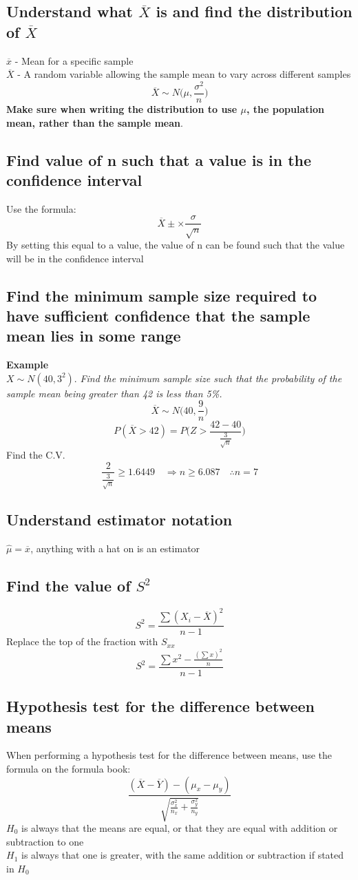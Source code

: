 \documentclass{article}[18pt]
\begin{document}
\subsection{Understand what $\overline{X}$ is and find the distribution of $\overline{X}$}
$\overline{x}$ - Mean for a specific sample\\
$\overline{X}$  - A random variable allowing the sample mean to vary across different samples
$$\overline{X}\sim N\Bigg(\mu,\frac{\sigma^2}{n}\Bigg)$$
\textbf{Make sure when writing the distribution to use $\mu$, the population mean, rather than the sample mean}.
\subsection{Find value of n such that a value is in the confidence interval}
Use the formula:
$$\overline{X}\pm \times\frac{\sigma}{\sqrt{n}}$$
By setting this equal to a value, the value of n can be found such that the value will be in the confidence interval

\subsection{Find the minimum sample size required to have sufficient confidence that the sample mean lies in some range}
\textbf{Example}\\
$X\sim N(40,3^2)$. \textit{Find the minimum sample size such that the probability of the sample mean being greater than 42 is less than 5\%.}
$$\overline{X}\sim N\Bigg(40,\frac{9}{n}\Bigg)$$
$$P(\overline{X}>42)=P\Bigg(Z>\frac{42-40}{\frac{3}{\sqrt{n}}}\Bigg)$$
Find the C.V.
$$\frac{2}{\frac{3}{\sqrt{n}}}\geqslant1.6449\quad \Rightarrow n\geqslant6.087 \quad \therefore n=7$$
\subsection{Understand estimator notation}
$\hat{\mu}=\overline{x}$, anything with a hat on is an estimator
\subsection{Find the value of $S^2$}
$$S^2=\frac{\sum(X_i-\overline{X})^2}{n-1}$$
Replace the top of the fraction with $S_{xx}$
$$S^2=\frac{\sum x^2-\frac{(\sum x)^2}{n}}{n-1}$$
\subsection{Hypothesis test for the difference between means} 
When performing a hypothesis test for the difference between means, use the formula on the formula book:
$$\frac{(\overline{X}-\overline{Y})-(\mu_x-\mu_y)}{\sqrt{\frac{\sigma^2_x}{n_x}+\frac{\sigma^2_y}{n_y}}}$$
$H_0$ is always that the means are equal, or that they are equal with addition or subtraction to one\\
$H_1$ is always that one is greater, with the same addition or subtraction if stated in $H_0$
\end{document}
